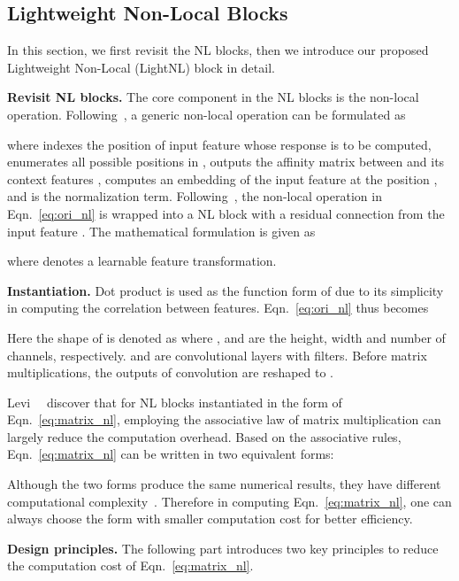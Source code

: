 \documentclass[10pt,twocolumn,letterpaper]{article}
\begin{document}
\subsection{Lightweight Non-Local Blocks}
\label{sec:LSAM}
In this section, we first revisit the NL blocks, then we introduce our proposed Lightweight Non-Local (LightNL) block in detail.

\vspace{0.5ex}\noindent\textbf{Revisit NL blocks.} The core component in the NL blocks is the non-local operation. Following~\cite{wang2018non}, a generic non-local operation can be formulated as

where  indexes the position of input feature  whose response is to be computed,  enumerates all possible positions in ,  outputs the affinity matrix between  and its context features ,  computes an embedding of the input feature at the position , and  is the normalization term. Following~\cite{wang2018non}, the non-local operation in Eqn.~\eqref{eq:ori_nl} is wrapped into a NL block with a residual connection from the input feature . The mathematical formulation is given as

where  denotes a learnable feature transformation.

\vspace{0.5ex}\noindent\textbf{Instantiation.}
Dot product is used as the function form of  due to its simplicity in computing the correlation between features. Eqn.~\eqref{eq:ori_nl} thus becomes

Here the shape of  is denoted as  where ,  and  are the height, width and number of channels, respectively.  and  are  convolutional layers with  filters. Before matrix multiplications, the outputs of  convolution are reshaped to . 

Levi~\etal~\cite{levi2018efficient} discover that for NL blocks instantiated in the form of Eqn.~\eqref{eq:matrix_nl}, employing the associative law of matrix multiplication can largely reduce the computation overhead. Based on the associative rules, Eqn.~\eqref{eq:matrix_nl} can be written in two equivalent forms:

Although the two forms produce the same numerical results, they have different computational complexity~\cite{levi2018efficient}. Therefore in computing Eqn.~\eqref{eq:matrix_nl}, one can always choose the form with smaller computation cost for better efficiency. 

\vspace{0.5ex}\noindent\textbf{Design principles.}
The following part introduces two key principles to reduce the computation cost of Eqn.~\eqref{eq:matrix_nl}.
\end{document}
